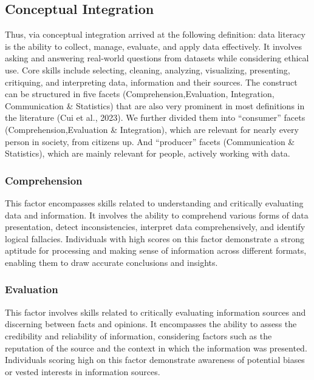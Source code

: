 \documentclass[
  12pt,
  a4paper,
  twoside]{article}
\begin{document}
\subsection{Conceptual Integration}\label{conceptual-integration}

Thus, via conceptual integration arrived at the following definition: data literacy is the ability to collect, manage, evaluate, and apply data effectively. It involves asking and answering real-world questions from datasets while considering ethical use. Core skills include selecting, cleaning, analyzing, visualizing, presenting, critiquing, and interpreting data, information and their sources.
The construct can be structured in five facets (Comprehension,Evaluation, Integration, Communication \& Statistics) that are also very prominent in most definitions in the literature (Cui et al., 2023). We further divided them into ``consumer'' facets (Comprehension,Evaluation \& Integration), which are relevant for nearly every person in society, from citizens up. And ``producer'' facets (Communication \& Statistics), which are mainly relevant for people, actively working with data.

\subsubsection{Comprehension}\label{comprehension}

This factor encompasses skills related to understanding and critically evaluating data and information. It involves the ability to comprehend various forms of data presentation, detect inconsistencies, interpret data comprehensively, and identify logical fallacies. Individuals with high scores on this factor demonstrate a strong aptitude for processing and making sense of information across different formats, enabling them to draw accurate conclusions and insights.

\subsubsection{Evaluation}\label{evaluation}

This factor involves skills related to critically evaluating information sources and discerning between facts and opinions. It encompasses the ability to assess the credibility and reliability of information, considering factors such as the reputation of the source and the context in which the information was presented. Individuals scoring high on this factor demonstrate awareness of potential biases or vested interests in information sources.
\end{document}

